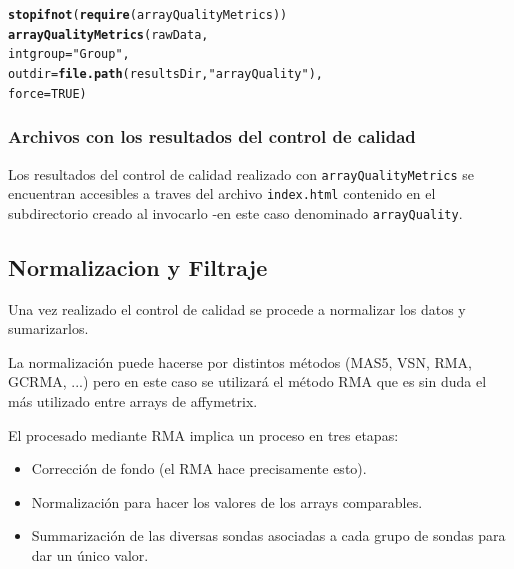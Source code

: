 \documentclass[a4paper]{article}\usepackage[]{graphicx}\usepackage[]{color}
\makeatletter
\newcommand{\hlnum}[1]{\textcolor[rgb]{0.686,0.059,0.569}{#1}}%
\newcommand{\hlstr}[1]{\textcolor[rgb]{0.192,0.494,0.8}{#1}}%
\newcommand{\hlstd}[1]{\textcolor[rgb]{0.345,0.345,0.345}{#1}}%
\newcommand{\hlkwc}[1]{\textcolor[rgb]{0.333,0.667,0.333}{#1}}%
\newcommand{\hlkwd}[1]{\textcolor[rgb]{0.737,0.353,0.396}{\textbf{#1}}}%
\newenvironment{kframe}{%
 \def\at@end@of@kframe{}%
 \ifinner\ifhmode%
  \def\at@end@of@kframe{\end{minipage}}%
  \begin{minipage}{\columnwidth}%
 \fi\fi%
 \def\FrameCommand##1{\hskip\@totalleftmargin \hskip-\fboxsep
 \colorbox{shadecolor}{##1}\hskip-\fboxsep
     \hskip-\linewidth \hskip-\@totalleftmargin \hskip\columnwidth}%
 \MakeFramed {\advance\hsize-\width
   \@totalleftmargin\z@ \linewidth\hsize
   \@setminipage}}%
 {\par\unskip\endMakeFramed%
 \at@end@of@kframe}
\newenvironment{knitrout}{}{} %
\makeatother
\begin{document}
\begin{knitrout}
\color{fgcolor}\begin{kframe}
\begin{alltt}
\hlkwd{stopifnot}\hlstd{(}\hlkwd{require}\hlstd{(arrayQualityMetrics))}
\hlkwd{arrayQualityMetrics}\hlstd{(rawData,}
                    \hlkwc{intgroup} \hlstd{=} \hlstr{"Group"}\hlstd{,}
                    \hlkwc{outdir} \hlstd{=} \hlkwd{file.path}\hlstd{(resultsDir,} \hlstr{"arrayQuality"}\hlstd{),}
                    \hlkwc{force}\hlstd{=}\hlnum{TRUE}\hlstd{)}
\end{alltt}


{\ttfamily\noindent\itshape\color{messagecolor}{\#\# The report will be written into directory 'C:/Users/Alexandre/Dropbox (VHIR)/SotaCV/Ejemplo\_de\_MDA\_con\_Bioconductor/results/arrayQuality'.}}\end{kframe}
\end{knitrout}

\subsubsection{Archivos con los resultados del control de calidad}

Los resultados del control de calidad realizado con \texttt{arrayQualityMetrics} se encuentran  accesibles a traves del archivo \texttt{index.html} contenido en el subdirectorio creado al invocarlo -en este caso denominado \texttt{arrayQuality}.


\subsection{Normalizacion y Filtraje}

Una vez realizado el control de calidad se procede a normalizar los datos y sumarizarlos.

La normalización puede hacerse por distintos métodos (MAS5, VSN, RMA, GCRMA, ...) pero en este caso se utilizará el método RMA que es sin duda el más utilizado entre arrays de affymetrix.

El procesado mediante RMA implica un proceso en tres etapas: 
\begin{itemize}
\item Corrección de fondo (el RMA hace precisamente esto).
\item Normalización para hacer los valores de los arrays comparables.
\item Summarización de las diversas sondas asociadas a cada grupo de sondas para dar un único valor.
\end{itemize}
\end{document}
